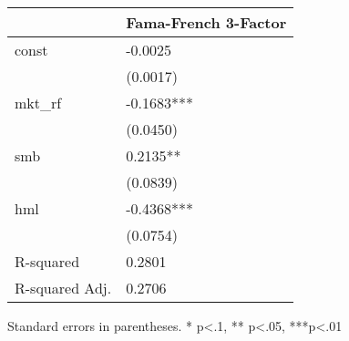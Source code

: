 \begin{table}
\caption{}
\label{}
\begin{center}
\begin{tabular}{ll}
\hline
               & Fama-French 3-Factor  \\
\hline
const          & -0.0025               \\
               & (0.0017)              \\
mkt\_rf        & -0.1683***            \\
               & (0.0450)              \\
smb            & 0.2135**              \\
               & (0.0839)              \\
hml            & -0.4368***            \\
               & (0.0754)              \\
R-squared      & 0.2801                \\
R-squared Adj. & 0.2706                \\
\hline
\end{tabular}
\end{center}
\end{table}
\bigskip
Standard errors in parentheses. \newline 
* p<.1, ** p<.05, ***p<.01